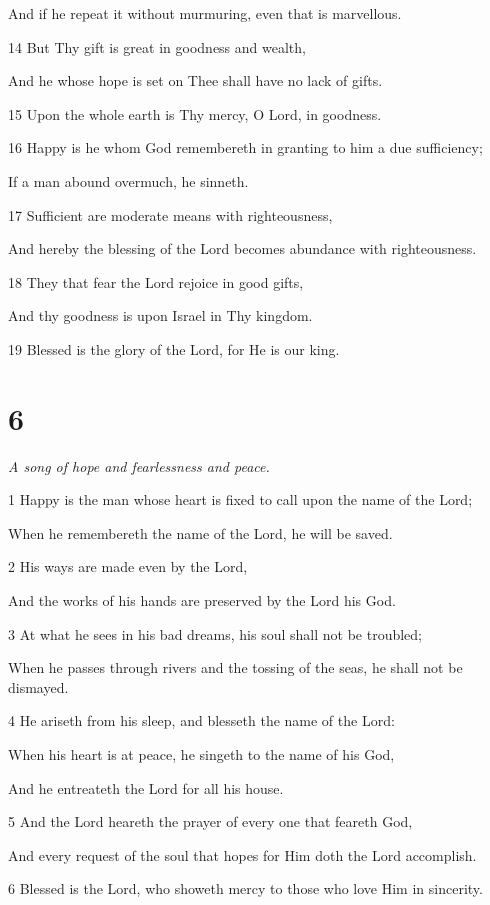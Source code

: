 \par  And if he repeat it without murmuring, even that is marvellous.
\par 14 But Thy gift is great in goodness and wealth,
\par  And he whose hope is set on Thee shall have no lack of gifts.
\par 15 Upon the whole earth is Thy mercy, O Lord, in goodness.
\par    
\par 16 Happy is he whom God remembereth in granting to him a due sufficiency;
\par  If a man abound overmuch, he sinneth.
\par 17 Sufficient are moderate means with righteousness,
\par  And hereby the blessing of the Lord becomes abundance with righteousness.
\par 18 They that fear the Lord rejoice in good gifts,
\par  And thy goodness is upon Israel in Thy kingdom.
\par    
\par 19 Blessed is the glory of the Lord, for He is our king.



\chapter{6}

\par \textit{A song of hope and fearlessness and peace.}

\par 1 Happy is the man whose heart is fixed to call upon the name of the Lord;
\par  When he remembereth the name of the Lord, he will be saved.
\par 2 His ways are made even by the Lord,
\par  And the works of his hands are preserved by the Lord his God.
\par 3 At what he sees in his bad dreams, his soul shall not be troubled;
\par  When he passes through rivers and the tossing of the seas, he shall not be dismayed.
\par 4 He ariseth from his sleep, and blesseth the name of the Lord:
\par  When his heart is at peace, he singeth to the name of his God,
\par  And he entreateth the Lord for all his house.
\par 5 And the Lord heareth the prayer of every one that feareth God,
\par  And every request of the soul that hopes for Him doth the Lord accomplish.
\par    
\par 6 Blessed is the Lord, who showeth mercy to those who love Him in sincerity.

